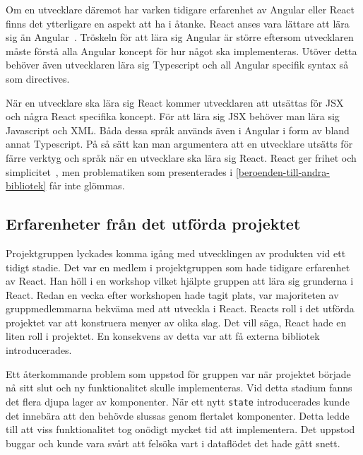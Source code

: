 Om en utvecklare däremot har varken tidigare erfarenhet av Angular eller React finns det ytterligare en aspekt att ha i åtanke. React anses vara lättare att lära sig än Angular~\cite{sitepoint}. Tröskeln för att lära sig Angular är större eftersom utvecklaren måste förstå alla Angular koncept för hur något ska implementeras. Utöver detta behöver även utvecklaren lära sig Typescript och all Angular specifik syntax så som directives. 

När en utvecklare ska lära sig React kommer utvecklaren att utsättas för JSX och några React specifika koncept. För att lära sig JSX behöver man lära sig Javascript och XML. Båda dessa språk används även i Angular i form av bland annat Typescript. På så sätt kan man argumentera att en utvecklare utsätts för färre verktyg och språk när en utvecklare ska lära sig React. React ger frihet och simplicitet~\cite{react-angular-paper}, men problematiken som presenterades i \ref{beroenden-till-andra-bibliotek} får inte glömmas.

\subsection{Erfarenheter från det utförda projektet}
Projektgruppen lyckades komma igång med utvecklingen av produkten vid ett tidigt stadie. Det var en medlem i projektgruppen som hade tidigare erfarenhet av React. Han höll i en workshop vilket hjälpte gruppen att lära sig grunderna i React. Redan en vecka efter workshopen hade tagit plats, var majoriteten av gruppmedlemmarna bekväma med att utveckla i React. Reacts roll i det utförda projektet var att konstruera menyer av olika slag. Det vill säga, React hade en liten roll i projektet. En konsekvens av detta var att få externa bibliotek introducerades. 

Ett återkommande problem som uppstod för gruppen var när projektet började nå sitt slut och ny funktionalitet skulle implementeras. Vid detta stadium fanns det flera djupa lager av komponenter. När ett nytt \texttt{state} introducerades kunde det innebära att den behövde slussas genom flertalet komponenter. Detta ledde till att viss funktionalitet tog onödigt mycket tid att implementera. Det uppstod buggar och kunde vara svårt att felsöka vart i dataflödet det hade gått snett. 


